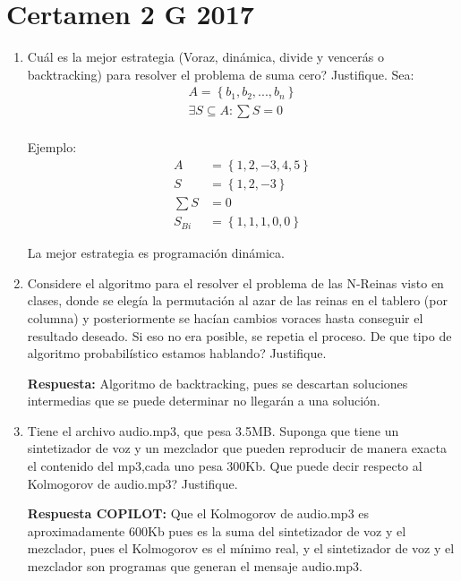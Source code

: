 \documentclass{templateNote}
\begin{document}
\section*{Certamen 2 G 2017}
\begin{enumerate}
    \subsection*{Representación de un arreglo con un arreglo binario (?)}
    \item Cuál es la mejor estrategia (Voraz, dinámica, divide y vencerás o backtracking) para resolver el problema de suma cero? Justifique.
    Sea:
    \begin{align*}
        A = \left\{b_1, b_2, ..., b_n\right\}\\
        \exists S \subseteq A : \sum S = 0 \\
    \end{align*}

    Ejemplo:
    \begin{align*}
        A &= \left\{1, 2, -3, 4, 5\right\}\\
        S &= \left\{1, 2, -3\right\}\\
        \sum S &= 0\\
        S_{Bi} &= \left\{1,1,1,0,0\right\}
    \end{align*}
    
    La mejor estrategia es programación dinámica.
    \\
    \item Considere el algoritmo para el resolver el problema de las N-Reinas visto en clases, donde se elegía la permutación al azar de las reinas en el tablero (por columna) y posteriormente se hacían cambios voraces hasta conseguir el resultado deseado. Si eso no era posible, se repetia el proceso. De que tipo de algoritmo probabilístico estamos hablando? Justifique.
    
    \textbf{Respuesta:} Algoritmo de backtracking, pues se descartan soluciones intermedias que se puede determinar no llegarán a una solución.

    \item Tiene el archivo audio.mp3, que pesa 3.5MB. Suponga que tiene un sintetizador de voz y un mezclador que pueden reproducir de manera exacta el contenido del mp3,cada uno pesa 300Kb. Que puede decir respecto al Kolmogorov de audio.mp3? Justifique.
    
    \textbf{Respuesta COPILOT:} Que el Kolmogorov de audio.mp3 es aproximadamente 600Kb pues es la suma del sintetizador de voz y el mezclador, pues el Kolmogorov es el mínimo real, y el sintetizador de voz y el mezclador son programas que generan el mensaje audio.mp3.
\end{enumerate}
\end{document}
